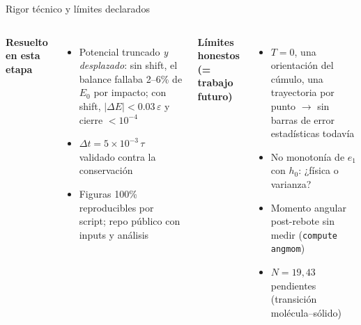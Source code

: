 \documentclass[11pt,aspectratio=169]{beamer}
\newcommand{\eps}{\varepsilon}
\begin{document}
\begin{frame}{Rigor técnico y límites declarados}
\begin{columns}[T]
\textbf{Resuelto en esta etapa}
\begin{itemize}
    \item \small Potencial truncado \emph{y desplazado}: sin shift, el
    balance fallaba 2--6\% de $E_0$ por impacto; con shift,
    $|\Delta E|<0.03\,\eps$ y cierre $<10^{-4}$
    \item \small $\Delta t=5\times10^{-3}\,\tau$ validado contra la
    conservación
    \item \small Figuras 100\% reproducibles por script; repo público
    con inputs y análisis
\end{itemize}
\textbf{Límites honestos (= trabajo futuro)}
\begin{itemize}
    \item \small $T=0$, una orientación del cúmulo, una trayectoria por
    punto $\to$ sin barras de error estadísticas todavía
    \item \small No monotonía de $e_1$ con $h_0$: ¿física o varianza?
    \item \small Momento angular post-rebote sin medir
    (\texttt{compute angmom})
    \item \small $N=19,43$ pendientes (transición molécula--sólido)
\end{itemize}
\end{columns}
\end{frame}
\end{document}
